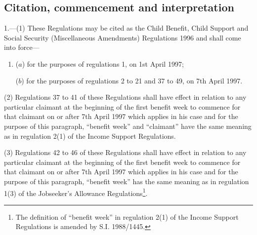 \documentclass[12pt,a4paper]{article}
\begin{document}
{\sloppy

\tableofcontents

}

\setcounter{secnumdepth}{-2}

\subsection[1. Citation, commencement and interpretation]{Citation, commencement and interpretation}

1.—(1) These Regulations may be cited as the Child Benefit, Child Support and Social Security (Miscellaneous Amendments) Regulations 1996 and shall come into force—
\begin{enumerate}\item[]
($a$) for the purposes of regulations 1, 
on 1st April 1997;

($b$) for the purposes of regulations 2 to 21 and 37 to 49, on 7th April 1997.

%
\end{enumerate}

(2) Regulations 37 to 41 of these Regulations shall have effect in relation to any particular claimant at the beginning of the first benefit week to commence for that claimant on or after 7th April 1997 which applies in his case and for the purpose of this paragraph, “benefit week” and “claimant” have the same meaning as in regulation 2(1) of the Income Support Regulations.

(3) Regulations 42 to 46 of these Regulations shall have effect in relation to any particular claimant at the beginning of the first benefit week to commence for that claimant on or after 7th April 1997 which applies in his case and for the purpose of this paragraph, “benefit week” has the same meaning as in regulation 1(3) of the Jobseeker’s Allowance Regulations\footnote{\frenchspacing The definition of “benefit week” in regulation 2(1) of the Income Support Regulations is amended by S.I. 1988/1445.}.
\end{document}
